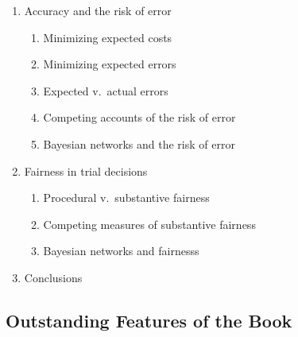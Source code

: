 \documentclass[10pt,dvipsnames,enabledeprecatedfontcommands]{scrartcl}
\begin{document}
\begin{enumerate}
\begin{enumerate}
  \item  Accuracy and the risk of error
  \begin{enumerate}
  \item  Minimizing expected costs
  \item  Minimizing expected errors
  \item  Expected v.\ actual errors
  \item  Competing accounts of the risk of error
  \item  Bayesian networks and the risk of error
  \end{enumerate}



  \item  Fairness in trial decisions
  \begin{enumerate}
  \item  Procedural v.\ substantive fairness
  \item  Competing measures of substantive fairness
  \item  Bayesian networks and fairnesss
  \end{enumerate}


 

\item Conclusions
\end{enumerate}
\end{enumerate}

\subsection{Outstanding Features of the
Book}\label{outstanding-features-of-the-book}
\end{document}
